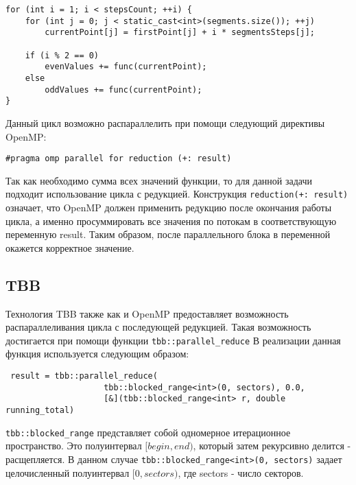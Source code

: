 \documentclass{report}
\begin{document}
\begin{lstlisting}
for (int i = 1; i < stepsCount; ++i) {
    for (int j = 0; j < static_cast<int>(segments.size()); ++j)
        currentPoint[j] = firstPoint[j] + i * segmentsSteps[j];

    if (i % 2 == 0)
        evenValues += func(currentPoint);
    else
        oddValues += func(currentPoint);
}
\end{lstlisting}
\par Данный цикл возможно распараллелить при помощи следующий директивы OpenMP:
\par \verb|#pragma omp parallel for reduction (+: result) |
\par Так как необходимо сумма всех значений функции, то для данной задачи подходит использование цикла с редукцией. Конструкция \verb|reduction(+: result)| означает, что OpenMP должен применить редукцию после окончания работы цикла, а именно просуммировать все значения по потокам в соответствующую переменную result. Таким образом, после параллельного блока в переменной окажется корректное значение.

\subsection*{TBB}
Технология TBB также как и OpenMP предоставляет возможность распараллеливания цикла с последующей редукцией. Такая возможность достигается при помощи функции \verb|tbb::parallel_reduce| В реализации данная функция используется следующим образом:
\begin{lstlisting}
 result = tbb::parallel_reduce(
                    tbb::blocked_range<int>(0, sectors), 0.0,
                    [&](tbb::blocked_range<int> r, double running_total)
\end{lstlisting}
\par\verb|tbb::blocked_range| представляет собой одномерное итерационное пространство. Это полуинтервал $[begin, end)$, который затем рекурсивно делится - расщепляется. В данном случае \verb|tbb::blocked_range<int>(0, sectors)| задает целочисленный полуинтервал $[0, sectors)$, где sectors - число секторов.



\newpage
\end{document}
